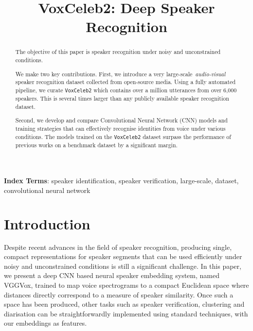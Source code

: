 \documentclass[a4paper]{article}
\title{VoxCeleb2: Deep Speaker Recognition}
\begin{document}
\maketitle
\begin{abstract}

The objective of this paper is speaker recognition under noisy and
unconstrained conditions.

We make two key contributions. First, we introduce a very large-scale~\textit{audio-visual} speaker recognition dataset collected from open-source media. Using a fully automated pipeline, we curate {\tt VoxCeleb2}
which contains over a million utterances from over 6,000 speakers. This is several times larger than any publicly available speaker recognition dataset.

Second, we develop and compare Convolutional Neural Network (CNN) models and training strategies that can effectively recognise identities from voice under various conditions.
The models trained on the  {\tt VoxCeleb2} dataset surpass the
performance of previous works on a benchmark dataset by a significant
margin. \\


\end{abstract}
\noindent\textbf{Index Terms}: speaker identification, speaker verification, large-scale, dataset, convolutional neural network

\let\thefootnote\relax{}


\section{Introduction} 
Despite recent advances in the field of speaker recognition, producing single, compact representations for speaker segments that can be used efficiently under noisy and unconstrained conditions is still a significant challenge. In this paper, we present a deep CNN based neural speaker embedding system, named VGGVox, trained to map voice spectrograms to a compact Euclidean space where distances directly correspond to a measure of speaker similarity. Once such a space has been produced, other tasks such as speaker verification, clustering and diarisation can be straightforwardly implemented using standard techniques, with our embeddings as features.
\end{document}
